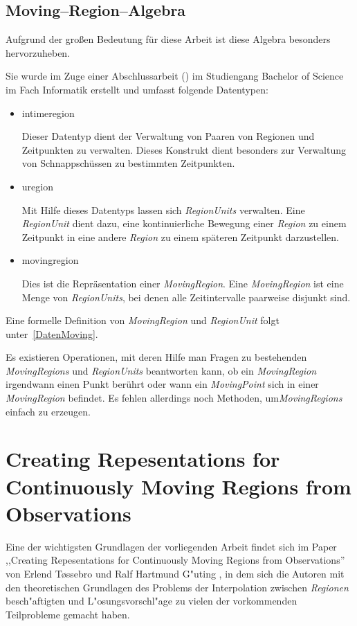 \subsection{Moving--Region--Algebra}
Aufgrund der großen Bedeutung für diese Arbeit ist diese Algebra besonders hervorzuheben.

Sie wurde im Zuge einer Abschlussarbeit (\cite{Mue}) im Studiengang Bachelor of Science im Fach Informatik  erstellt und umfasst folgende Datentypen:

\begin{itemize}
\item intimeregion

Dieser Datentyp dient der Verwaltung von Paaren von Regionen und Zeitpunkten zu verwalten. Dieses Konstrukt dient besonders zur Verwaltung von Schnappschüssen zu bestimmten Zeitpunkten.
\item uregion

Mit Hilfe dieses Datentyps lassen sich \textit{RegionUnits} verwalten. Eine \textit{RegionUnit} dient dazu, eine kontinuierliche Bewegung einer \textit{Region} zu einem Zeitpunkt in eine andere \textit{Region} zu einem späteren Zeitpunkt darzustellen. 
\item movingregion

Dies ist die Repräsentation einer \textit{MovingRegion}. Eine \textit{MovingRegion} ist eine Menge von \textit{RegionUnits}, bei denen alle Zeitintervalle paarweise disjunkt sind. 
\end{itemize}

Eine formelle Definition von \textit{MovingRegion} und \textit{RegionUnit} folgt unter~\vref{DatenMoving}.

Es existieren Operationen, mit deren Hilfe man Fragen zu bestehenden \textit{MovingRegions} und \textit{RegionUnits} beantworten kann, ob ein \textit{MovingRegion} irgendwann einen Punkt berührt oder wann ein \textit{MovingPoint} sich in einer \textit{MovingRegion} befindet. Es fehlen allerdings noch Methoden, um\textit{MovingRegions}  einfach zu erzeugen. 
 
\section{Creating Repesentations for Continuously Moving Regions from Observations}\label{Tossebro}

Eine der wichtigsten Grundlagen der vorliegenden Arbeit findet sich im Paper ,,Creating Repesentations for Continuously Moving Regions from Observations'' \cite{TG} von Erlend T\o{}ssebro und Ralf Hartmund G"uting \cite{TG}, in dem sich die Autoren mit den theoretischen Grundlagen des Problems der Interpolation zwischen \textit{Regionen} besch"aftigten und L"osungsvorschl"age zu vielen der vorkommenden Teilprobleme gemacht haben.

